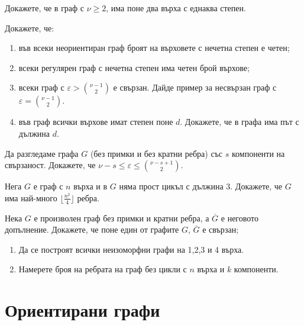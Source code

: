 \begin{problem}
  Докажете, че в граф с $\nu\geq 2$, има поне два върха с еднаква степен.
\end{problem}

\begin{problem}
  Докажете, че:
  \begin{enumerate}
  \item
    във всеки неориентиран граф броят на върховете с нечетна степен е четен;
  \item
    всеки регулярен граф с нечетна степен има четен брой върхове;
  \item
    всеки граф с $\varepsilon > \binom{\nu-1}{2}$ е свързан.
    Дайде пример за несвързан граф с $\varepsilon = \binom{\nu-1}{2}$.
  \item
    във граф всички върхове имат степен поне $d$.
    Докажете, че в графа има път с дължина $d$.
  \end{enumerate}
\end{problem}


\begin{problem} %
  Да разгледаме графа $G$ (без примки и без кратни ребра) със $s$ компоненти на свързаност.
  Докажете, че $\nu - s \leq \varepsilon \leq \binom{\nu-s+1}{2}$.
\end{problem}

\begin{problem}
  Нега $G$ е граф с $n$ върха и в $G$ няма прост цикъл с дължина 3.
  Докажете, че $G$ има най-много $\lfloor{\frac{n^2}{4}}\rfloor$ ребра.
\end{problem}

\begin{problem}
  Нека $G$ е произволен граф без примки и кратни ребра, а $\overline{G}$ е неговото допълнение.
  Докажете, че поне един от графите $G$, $\overline{G}$ е свързан;
\end{problem}


\begin{problem}
  \begin{enumerate}
  \item
    Да се построят всички неизоморфни графи на 1,2,3 и 4 върха.
  \item
    Намерете броя на ребрата на граф без цикли с $n$ върха и $k$ компоненти.
  \end{enumerate}
\end{problem}

\section{Ориентирани графи}


